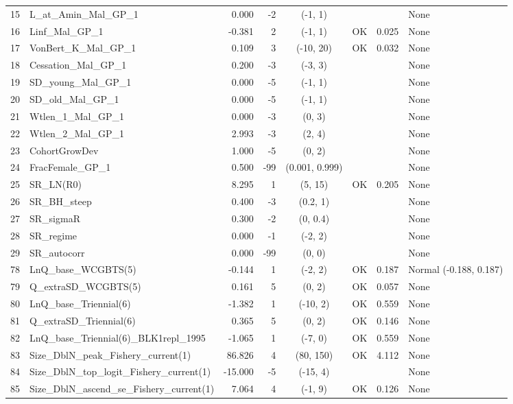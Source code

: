 \documentclass[12pt,]{article}
\begin{document}
\begin{landscape}
\begin{longtable}{rlrrcccl}
  15 & L\_at\_Amin\_Mal\_GP\_1 & 0.000 & -2 & (-1, 1) &  &  & None \\ 
  16 & Linf\_Mal\_GP\_1 & -0.381 & 2 & (-1, 1) & OK & 0.025 & None \\ 
  17 & VonBert\_K\_Mal\_GP\_1 & 0.109 & 3 & (-10, 20) & OK & 0.032 & None \\ 
  18 & Cessation\_Mal\_GP\_1 & 0.200 & -3 & (-3, 3) &  &  & None \\ 
  19 & SD\_young\_Mal\_GP\_1 & 0.000 & -5 & (-1, 1) &  &  & None \\ 
  20 & SD\_old\_Mal\_GP\_1 & 0.000 & -5 & (-1, 1) &  &  & None \\ 
  21 & Wtlen\_1\_Mal\_GP\_1 & 0.000 & -3 & (0, 3) &  &  & None \\ 
  22 & Wtlen\_2\_Mal\_GP\_1 & 2.993 & -3 & (2, 4) &  &  & None \\ 
  23 & CohortGrowDev & 1.000 & -5 & (0, 2) &  &  & None \\ 
  24 & FracFemale\_GP\_1 & 0.500 & -99 & (0.001, 0.999) &  &  & None \\ 
  25 & SR\_LN(R0) & 8.295 & 1 & (5, 15) & OK & 0.205 & None \\ 
  26 & SR\_BH\_steep & 0.400 & -3 & (0.2, 1) &  &  & None \\ 
  27 & SR\_sigmaR & 0.300 & -2 & (0, 0.4) &  &  & None \\ 
  28 & SR\_regime & 0.000 & -1 & (-2, 2) &  &  & None \\ 
  29 & SR\_autocorr & 0.000 & -99 & (0, 0) &  &  & None \\ 
  78 & LnQ\_base\_WCGBTS(5) & -0.144 & 1 & (-2, 2) & OK & 0.187 & Normal (-0.188, 0.187) \\ 
  79 & Q\_extraSD\_WCGBTS(5) & 0.161 & 5 & (0, 2) & OK & 0.057 & None \\ 
  80 & LnQ\_base\_Triennial(6) & -1.382 & 1 & (-10, 2) & OK & 0.559 & None \\ 
  81 & Q\_extraSD\_Triennial(6) & 0.365 & 5 & (0, 2) & OK & 0.146 & None \\ 
  82 & LnQ\_base\_Triennial(6)\_BLK1repl\_1995 & -1.065 & 1 & (-7, 0) & OK & 0.559 & None \\ 
  83 & Size\_DblN\_peak\_Fishery\_current(1) & 86.826 & 4 & (80, 150) & OK & 4.112 & None \\ 
  84 & Size\_DblN\_top\_logit\_Fishery\_current(1) & -15.000 & -5 & (-15, 4) &  &  & None \\ 
  85 & Size\_DblN\_ascend\_se\_Fishery\_current(1) & 7.064 & 4 & (-1, 9) & OK & 0.126 & None \\ 

\end{longtable}
\end{landscape}
\end{document}
